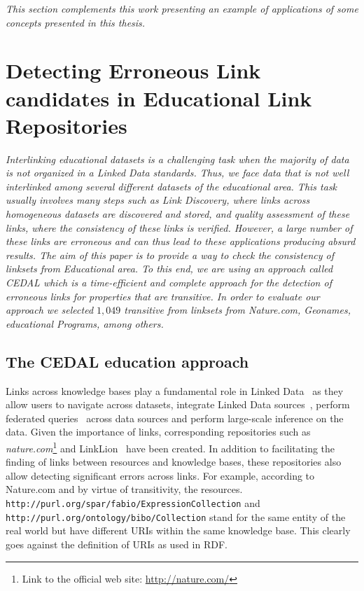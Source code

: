 \textit{This section complements this work presenting an example of applications of some concepts presented in this thesis.}

\section{Detecting Erroneous Link candidates in Educational Link Repositories}

\textit{Interlinking educational datasets is a challenging task when the majority of data is not organized in a Linked Data standards. Thus, we face data that is not well interlinked among several different datasets of the educational area. This task usually involves many steps such as Link Discovery, where links across homogeneous datasets are discovered and stored, and quality assessment of these links, where the consistency of these links is verified. 
    However, a large number of these links are erroneous and can thus lead to these applications producing absurd results.
    The aim of this paper is to provide a way to check the consistency of linksets from Educational area. To this end, we are using an approach called CEDAL which is a time-efficient and complete approach for the detection of erroneous links for properties that are transitive.
    In order to evaluate our approach we selected $1,049$ transitive from linksets from Nature.com, Geonames, educational Programs, among others.}

\subsection{The CEDAL education approach}
Links across knowledge bases play a fundamental role in Linked Data~\cite{Albertoni:2013:ALQ:2457317.2457327} as they  allow users to navigate across datasets, integrate Linked Data sources~\cite{NgomoSL14}, perform federated queries~\cite{saleem2013daw} across data sources and perform large-scale inference on the data.
Given the importance of links, corresponding repositories such as \emph{nature.com}\footnote{Link to the official web site: \url{http://nature.com/}} and LinkLion~\cite{nentwig2014linklion} have been created. 
In addition to facilitating the finding of links between  resources and knowledge bases, these repositories also allow detecting significant errors across links. 
For example, according to Nature.com and by virtue of transitivity, the resources. \texttt{http://purl.org/spar/fabio/ExpressionCollection} and \texttt{http://purl.org/ontology/bibo/Collection} stand for the same entity of the real world but have different URIs within the same knowledge base. 
This clearly goes against the definition of URIs as used in RDF.

